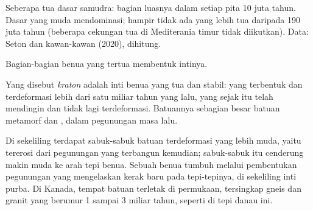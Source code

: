 \begin{omfigure}

{\small Seberapa tua dasar samudra: bagian luasnya dalam setiap pita 10 juta
tahun. Dasar yang muda mendominasi; hampir tidak ada yang lebih tua daripada 190
juta tahun (beberapa cekungan tua di Mediterania timur tidak diikutkan). Data:
Seton dan kawan-kawan (2020), dihitung.}
\end{omfigure}

Bagian-bagian benua yang tertua membentuk intinya.

\begin{definition}[Kraton]\label{def:g12:continental-crust:craton}
Yang disebut \emph{kraton} adalah inti benua yang tua dan stabil:
 yang terbentuk dan terdeformasi lebih dari satu miliar tahun yang
lalu, yang sejak itu telah mendingin dan tidak lagi terdeformasi. Batuannya
sebagian besar batuan metamorf dan ,  dalam pegunungan masa
lalu.
\end{definition}

Di sekeliling  terdapat sabuk-sabuk batuan terdeformasi yang lebih muda,
yaitu  tererosi dari pegunungan yang terbangun kemudian; sabuk-sabuk
itu cenderung makin muda ke arah tepi benua. Sebuah benua tumbuh melalui
pembentukan pegunungan yang mengelaskan kerak baru pada tepi-tepinya, di
sekeliling inti purba. Di Kanada, tempat batuan  terletak di permukaan,
tersingkap gneis dan granit yang berumur 1 sampai 3 miliar tahun, seperti di
tepi danau ini.

